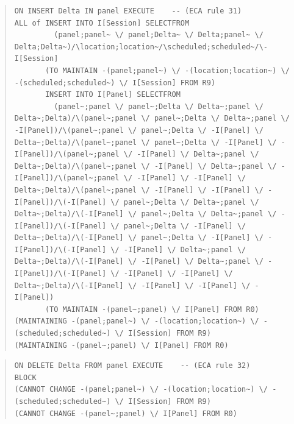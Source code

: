 \documentclass[10pt,a4paper]{report}              %
\theoremstyle{plain}\theorembodyfont{\rmfamily}\newtheorem{definition}{Definition}[section]
\theoremstyle{plain}\theorembodyfont{\rmfamily}\newtheorem{designrule}[definition]{Requirement}
\begin{document}
\begin{quote}
\begin{verbatim}
ON INSERT Delta IN panel EXECUTE    -- (ECA rule 31)
ALL of INSERT INTO I[Session] SELECTFROM
         (panel;panel~ \/ panel;Delta~ \/ Delta;panel~ \/ Delta;Delta~)/\location;location~/\scheduled;scheduled~/\-I[Session]
       (TO MAINTAIN -(panel;panel~) \/ -(location;location~) \/ -(scheduled;scheduled~) \/ I[Session] FROM R9)
       INSERT INTO I[Panel] SELECTFROM
         (panel~;panel \/ panel~;Delta \/ Delta~;panel \/ Delta~;Delta)/\(panel~;panel \/ panel~;Delta \/ Delta~;panel \/ -I[Panel])/\(panel~;panel \/ panel~;Delta \/ -I[Panel] \/ Delta~;Delta)/\(panel~;panel \/ panel~;Delta \/ -I[Panel] \/ -I[Panel])/\(panel~;panel \/ -I[Panel] \/ Delta~;panel \/ Delta~;Delta)/\(panel~;panel \/ -I[Panel] \/ Delta~;panel \/ -I[Panel])/\(panel~;panel \/ -I[Panel] \/ -I[Panel] \/ Delta~;Delta)/\(panel~;panel \/ -I[Panel] \/ -I[Panel] \/ -I[Panel])/\(-I[Panel] \/ panel~;Delta \/ Delta~;panel \/ Delta~;Delta)/\(-I[Panel] \/ panel~;Delta \/ Delta~;panel \/ -I[Panel])/\(-I[Panel] \/ panel~;Delta \/ -I[Panel] \/ Delta~;Delta)/\(-I[Panel] \/ panel~;Delta \/ -I[Panel] \/ -I[Panel])/\(-I[Panel] \/ -I[Panel] \/ Delta~;panel \/ Delta~;Delta)/\(-I[Panel] \/ -I[Panel] \/ Delta~;panel \/ -I[Panel])/\(-I[Panel] \/ -I[Panel] \/ -I[Panel] \/ Delta~;Delta)/\(-I[Panel] \/ -I[Panel] \/ -I[Panel] \/ -I[Panel])
       (TO MAINTAIN -(panel~;panel) \/ I[Panel] FROM R0)
(MAINTAINING -(panel;panel~) \/ -(location;location~) \/ -(scheduled;scheduled~) \/ I[Session] FROM R9)
(MAINTAINING -(panel~;panel) \/ I[Panel] FROM R0)
\end{verbatim}
\end{quote}
\begin{quote}
\begin{verbatim}
ON DELETE Delta FROM panel EXECUTE    -- (ECA rule 32)
BLOCK
(CANNOT CHANGE -(panel;panel~) \/ -(location;location~) \/ -(scheduled;scheduled~) \/ I[Session] FROM R9)
(CANNOT CHANGE -(panel~;panel) \/ I[Panel] FROM R0)
\end{verbatim}
\end{quote}
\end{document}
